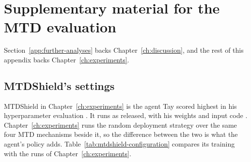 \documentclass{cshonours}
\begin{document}

\FloatBarrier



\chapter{Supplementary material for the MTD evaluation}
\label{app:supplementary-results}

Section~\ref{app:further-analyses} backs Chapter~\ref{ch:discussion}, and the
rest of this appendix backs Chapter~\ref{ch:experiments}.

\section{MTDShield's settings}
\label{app:mtdshield}\label{app:mtdshield-selection}\label{app:mtdshield-configuration}%
\label{app:mtdshield-changes}\label{app:mtdshield-limitations}\label{app:mtdshield-observed}

MTDShield in Chapter~\ref{ch:experiments} is the agent Tay scored highest in
his hyperparameter evaluation \citep[Sect.~5.2]{tay2024}. It runs as released, with his
weights and input code \citep{tay2024code}. Chapter~\ref{ch:experiments} runs
the random deployment strategy over the same four MTD mechanisms beside it, so
the difference between the two is what the agent's policy adds.
Table~\ref{tab:mtdshield-configuration} compares its training with the runs
of Chapter~\ref{ch:experiments}.
\end{document}
